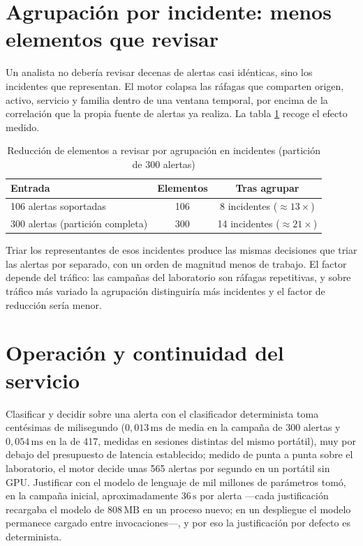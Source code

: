 \section{Agrupación por incidente: menos elementos que revisar}

Un analista no debería revisar decenas de alertas casi idénticas, sino los incidentes que
representan. El motor colapsa las ráfagas que comparten origen, activo, servicio y familia dentro
de una ventana temporal, por encima de la correlación que la propia fuente de alertas ya realiza.
La tabla \ref{tab:agrupacion} recoge el efecto medido.

\begin{table}[H]
  \centering
  \caption{Reducción de elementos a revisar por agrupación en incidentes (partición de 300 alertas)}
  \label{tab:agrupacion}
  \begin{tabular}{@{}p{}cc@{}}
    \toprule
    \textbf{Entrada} & \textbf{Elementos} & \textbf{Tras agrupar} \\
    \midrule
    106 alertas soportadas & 106 & 8 incidentes ($\approx 13\times$) \\
    300 alertas (partición completa) & 300 & 14 incidentes ($\approx 21\times$) \\
    \bottomrule
  \end{tabular}
\end{table}

Triar los representantes de esos incidentes produce las mismas decisiones que triar las alertas
por separado, con un orden de magnitud menos de trabajo. El factor depende del tráfico: las
campañas del laboratorio son ráfagas repetitivas, y sobre tráfico más variado la agrupación
distinguiría más incidentes y el factor de reducción sería menor.

\section{Operación y continuidad del servicio}

Clasificar y decidir sobre una alerta con el clasificador determinista toma centésimas de
milisegundo ($0,013\,\text{ms}$ de media en la campaña de 300 alertas y $0,054\,\text{ms}$ en la de
417, medidas en sesiones distintas del mismo portátil), muy por debajo del presupuesto de latencia establecido; medido de punta a punta
sobre el laboratorio, el motor decide unas 565 alertas por segundo en un portátil sin GPU. Justificar
con el modelo de lenguaje de mil millones de parámetros tomó, en la campaña inicial, aproximadamente
$36\,\text{s}$ por alerta ---cada justificación recargaba el modelo de $808\,\text{MB}$ en un proceso
nuevo; en un despliegue el modelo permanece cargado entre invocaciones---, y por eso la
justificación por defecto es determinista.

